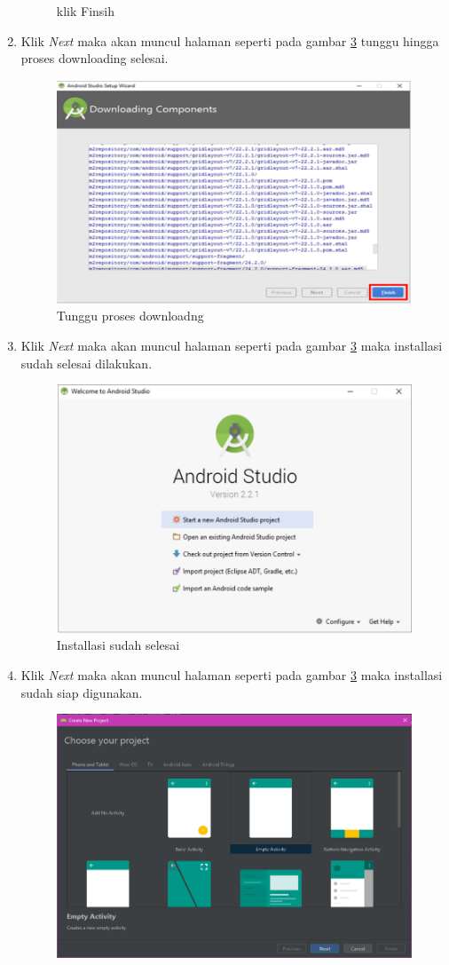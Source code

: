 \begin{enumerate}
\begin{figure}[!htbp]
  		 \caption{klik Finsih}\label{fig:done}
		 \end{figure}
		 \item Klik \textit{Next} maka akan muncul halaman seperti pada gambar \ref{fig:done} tunggu hingga proses downloading selesai.
		 \begin{figure}[!htbp]
  		 \centering
 		 \includegraphics[width=.75\textwidth]{figures/In18.png}
  		 \caption{Tunggu proses downloadng}\label{fig:done}
		 \end{figure}
		 \item Klik \textit{Next} maka akan muncul halaman seperti pada gambar \ref{fig:done} maka installasi sudah selesai dilakukan.
		 \begin{figure}[!htbp]
  		 \centering
 		 \includegraphics[width=.75\textwidth]{figures/In19.png}
  		 \caption{Installasi sudah selesai}\label{fig:done}
		 \end{figure}
		 \item Klik \textit{Next} maka akan muncul halaman seperti pada gambar \ref{fig:done} maka installasi sudah siap digunakan.
		 \begin{figure}[!htbp]
  		 \centering
 		 \includegraphics[width=.75\textwidth]{figures/In20.png}

\end{figure}
\end{enumerate}

